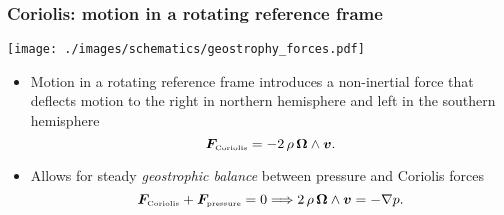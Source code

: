 \documentclass[10pt]{beamer}
\begin{document}
\begin{frame}
  \frametitle{Coriolis: motion in a rotating reference frame}

\begin{center}
\vspace{-.25cm}
\hspace{1cm}
{\texttt{[image: ./images/schematics/geostrophy\_forces.pdf]}}
\vspace{-.2cm}

\end{center}


\begin{exampleblock}{}
\begin{itemize}
\item Motion in a rotating reference frame introduces a non-inertial
  force that deflects motion to the right in northern hemisphere and
  left in the southern hemisphere 
\begin{equation}
   {\bm F}_{\mbox{\tiny Coriolis}}  = - 2 \, \rho \,  {\bm \Omega} \wedge  {\bm v}.
\end{equation}

\item Allows for steady {\it geostrophic balance} between pressure and Coriolis forces 
\begin{equation}
 {\bm F}_{\mbox{\tiny Coriolis}}  +  {\bm F}_{\mbox{\tiny pressure}}  = 0  \Longrightarrow 
   2 \, \rho \,  {\bm \Omega} \wedge  {\bm v} = -\nabla p. 
\end{equation}

\end{itemize}
\end{exampleblock}{}



\end{frame}
\end{document}
